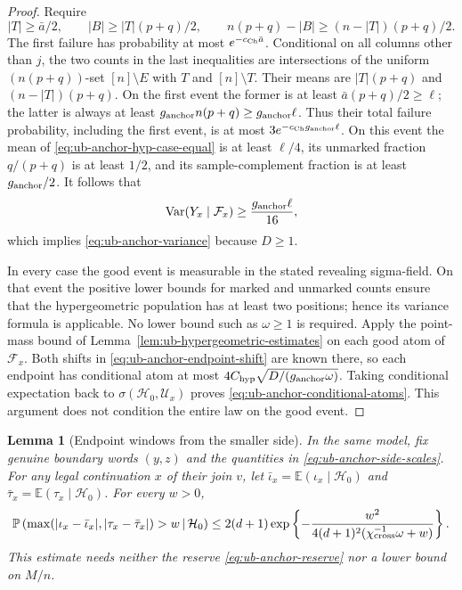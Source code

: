 \documentclass[11pt]{article}
\numberwithin{equation}{section}
\newtheorem{lemma}[lemma]{Lemma}
\newcommand{\E}{\mathbb E}
\newcommand{\Pp}{\mathbb P}
\newcommand{\Var}{\operatorname{Var}}
\newcommand{\1}{\mathbf 1}
\begin{document}
\begin{proof}
Require
\[
 |T|\ge\bar a/2,\qquad
 |B|\ge |T|(p+q)/2,\qquad
 n(p+q)-|B|\ge(n-|T|)(p+q)/2.
\]
The first failure has probability at most $e^{-c_{\rm Ch}\bar a}$.
Conditional on all columns other than $j$, the two counts in the
last inequalities are intersections of the uniform $(n(p+q))$-set
$[n]\setminus E$ with $T$ and $[n]\setminus T$.  Their means are
$|T|(p+q)$ and $(n-|T|)(p+q)$.  On the first event the former is at
least $\bar a(p+q)/2\ge\ell$; the latter is always at least
$g_{\rm anchor}n(p+q)\ge g_{\rm anchor}\ell$.
Thus their total failure probability, including the first event, is
at most $3e^{-c_{\rm Ch}g_{\rm anchor}\ell}$.
On this event the mean of \eqref{eq:ub-anchor-hyp-case-equal} is at
least $\ell/4$, its unmarked fraction $q/(p+q)$ is at least $1/2$,
and its sample-complement fraction is at least $g_{\rm anchor}/2$.
It follows that
\[
 \Var(Y_x\mid\mathcal F_x)\ge
 \frac{g_{\rm anchor}\ell}{16},
\]
which implies \eqref{eq:ub-anchor-variance} because $D\ge1$.

In every case the good event is measurable in the stated revealing
sigma-field.  On that event the positive lower bounds for marked
and unmarked counts ensure that the hypergeometric population has
at least two positions; hence its variance formula is applicable.
No lower bound such as $\omega\ge1$ is required.  Apply the point-mass
bound of Lemma~\ref{lem:ub-hypergeometric-estimates} on each good atom
of $\mathcal F_x$.  Both shifts in
\eqref{eq:ub-anchor-endpoint-shift} are known there, so each endpoint
has conditional atom at most
$4C_{\rm hyp}\sqrt{D/(g_{\rm anchor}\omega)}$.
Taking conditional expectation back to
$\sigma(\mathcal H_0,\mathcal U_x)$ proves
\eqref{eq:ub-anchor-conditional-atoms}.  This argument does not
condition the entire law on the good event.
\end{proof}

\begin{lemma}[Endpoint windows from the smaller side]
\label{lem:ub-anchor-endpoint-window}
In the same model, fix genuine boundary words $(y,z)$ and the
quantities in \eqref{eq:ub-anchor-side-scales}.  For any legal
continuation $x$ of their join $v$, let
$\bar\iota_x=\E(\iota_x\mid\mathcal H_0)$ and
$\bar\tau_x=\E(\tau_x\mid\mathcal H_0)$.
For every $w>0$,
\begin{equation}
\label{eq:ub-anchor-finite-window}
 \Pp\left(
   \max(|\iota_x-\bar\iota_x|,|\tau_x-\bar\tau_x|)>w
       \,\middle|\,\mathcal H_0\right)
 \le2(d+1)\exp\left\{
 -\frac{w^2}{4(d+1)^2(\chi_{\rm cross}^{-1}\omega+w)}
 \right\}.
\end{equation}
This estimate needs neither the reserve
\eqref{eq:ub-anchor-reserve} nor a lower bound on $M/n$.
\end{lemma}
\end{document}
